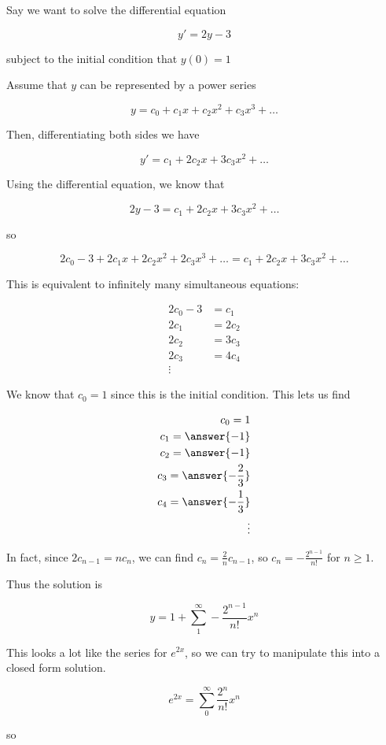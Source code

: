 \documentclass{ximera}
\begin{document}
\begin{example}
Say we want to solve the differential equation

\[
y' = 2y-3
\]

subject to the initial condition that $y(0)=1$

Assume that $y$ can be represented by a power series

\[
y = c_0+c_1x+c_2x^2+c_3x^3+\dots
\]

Then, differentiating both sides we have

\[
y' = c_1+2c_2x+3c_3x^2+\dots
\]

Using the differential equation, we know that

\[
2y-3 = c_1+2c_2x+3c_3x^2+\dots
\]

so

\[
2c_0-3+2c_1x+2c_2x^2+2c_3x^3+\dots = c_1+2c_2x+3c_3x^2+\dots
\]



This is equivalent to infinitely many simultaneous equations:

\begin{align*}
	2c_0-3 &= c_1\\
	2c_1 &= 2c_2\\
	2c_2 &= 3c_3\\
	2c_3 &=4c_4\\
	\vdots
\end{align*}

We know that $c_0 = 1$ since this is the initial condition. 
This lets us find

\begin{align*}
c_0 = 1\\
c_1 = \answer{-1}\\
c_2=\answer{-1}\\
c_3=\answer{-\frac{2}{3}}\\
c_4=\answer{-\frac{1}{3}}\\
\vdots
\end{align*}

In fact, since $2c_{n-1} = nc_n$, we can find $c_n = \frac{2}{n}c_{n-1}$, so $c_n = -\frac{2^{n-1}}{n!}$ for $n \geq 1$.

Thus the solution is 

\[
y = 1+\sum_1^\infty -\frac{2^{n-1}}{n!} x^n
\]

This looks a lot like the series for $e^{2x}$, so we can try to manipulate this into a closed form solution.

\[
e^{2x} = \sum_0^\infty \frac{2^n}{n!} x^n
\]

so 


\end{example}
\end{document}
